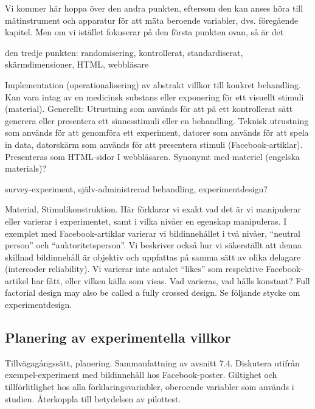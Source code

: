\documentclass[
]{book}
\begin{document}
Vi kommer här hoppa över den andra punkten, eftersom den kan anses höra till mätinstrument och apparatur för att mäta beroende variabler, dvs. föregående kapitel. Men om vi istället fokuserar på den första punkten ovan, så är det

den tredje punkten: randomisering, kontrollerat, standardiserat, skärmdimensioner, HTML, webbläsare

Implementation (operationalisering) av abstrakt villkor till konkret behandling. Kan vara intag av en medicinsk substans eller exponering för ett visuellt stimuli (material). Generellt: Utrustning som används för att på ett kontrollerat sätt generera eller presentera ett sinnesstimuli eller en behandling. Teknisk utrustning som används för att genomföra ett experiment, datorer som används för att spela in data, datorskärm som används för att presentera stimuli (Facebook-artiklar). Presenteras som HTML-sidor I webbläsaren. Synonymt med materiel (engelska materials)?

survey-experiment, själv-administrerad behandling, experimentdesign?

Material, Stimulikonstruktion. Här förklarar vi exakt vad det är vi manipulerar eller varierar i experimentet, samt i vilka nivåer en egenskap manipuleras. I exemplet med Facebook-artiklar varierar vi bildinnehållet i två nivåer, ``neutral person'' och ``auktoritetsperson''. Vi beskriver också hur vi säkerställt att denna skillnad bildinnehåll är objektiv och uppfattas på samma sätt av olika delagare (intercoder reliability). Vi varierar inte antalet ``likes'' som respektive Facebook-artikel har fått, eller vilken källa som visas. Vad varieras, vad hålls konstant? Full factorial design may also be called a fully crossed design. Se följande stycke om experimentdesign.

\hypertarget{sub07.4.6}{%
\subsection{Planering av experimentella villkor}\label{sub07.4.6}}

Tillvägagångssätt, planering. Sammanfattning av avsnitt 7.4. Diskutera utifrån exempel-experiment med bildinnehåll hos Facebook-poster. Giltighet och tillförlitlighet hos alla förklaringsvariabler, oberoende variabler som används i studien. Återkoppla till betydelsen av pilottest.
\end{document}
